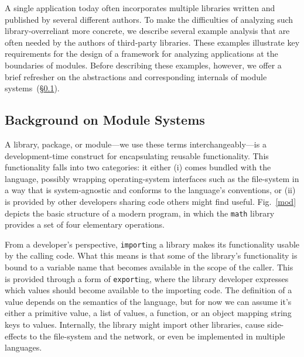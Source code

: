 \documentclass[letterpaper,twocolumn,10pt]{article}
\def\ie{{\em i.e.}, }
\newcommand{\ttt}[1]{\texttt{#1}}
\newcommand{\sx}[1]{(\S\ref{#1})}
\newcommand{\fixme}[1]{{\color{red}#1}}
\begin{document}
A single application today often incorporates multiple libraries written and published by several different authors.
To make the difficulties of analyzing such library-overreliant more concrete, we describe several example analysis that are often needed by the authors of third-party libraries.
These examples illustrate key requirements for the design of a framework for analyzing applications at the boundaries of modules.
Before describing these examples, however, we offer a brief refresher on the abstractions and corresponding internals of module systems~\sx{bg1}.


\subsection{Background on Module Systems}
\label{bg1}

A library, package, or module---we use these terms interchangeably---is a development-time construct for encapsulating reusable functionality.
This functionality falls into two categories:
  it either (i) comes bundled with the language, possibly wrapping operating-system interfaces such as the file-system in a way that is system-agnostic and conforms to the language's conventions,
  or (ii) is provided by other developers sharing code others might find useful.
Fig.~\ref{mod} depicts the basic structure of a modern program, in which the \ttt{math} library provides a set of four elementary operations.

From a developer's perspective, \ttt{import}ing a library makes its functionality usable by the calling code. 
What this means is that some of the library's functionality is bound to a variable name that becomes available in the scope of the caller.
This is provided through a form of \ttt{export}ing, where the library developer expresses which values should become available to the importing code.
The definition of a value depends on the semantics of the language, but for now we can assume it's either a primitive value, a list of values, a function, or an object mapping string keys to values.
Internally, the library might import other libraries, cause side-effects to the file-system and the network, or even be implemented in multiple languages.
\end{document}
